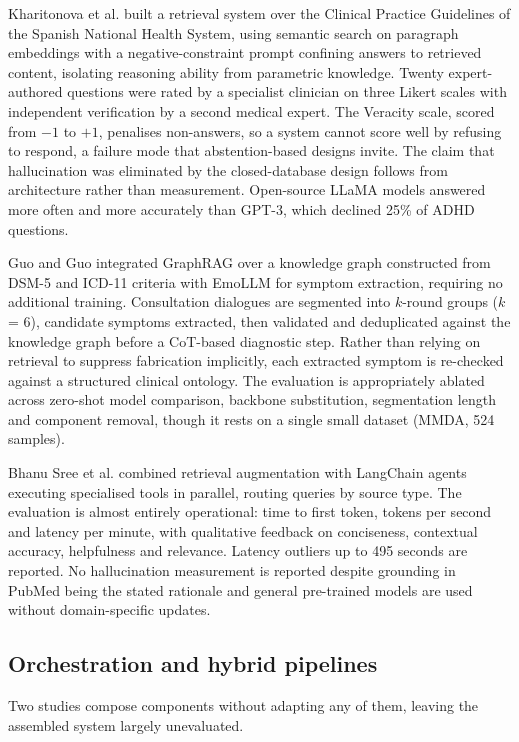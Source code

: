 \documentclass[11pt]{article}
\begin{document}
	Kharitonova et al.\cite{Kharitonova15062025} built a retrieval system over the Clinical Practice Guidelines of the Spanish National Health System, using semantic search on paragraph embeddings with a negative-constraint prompt confining answers to retrieved content, isolating reasoning ability from parametric knowledge. Twenty expert-authored questions were rated by a specialist clinician on three Likert scales with independent verification by a second medical expert. The Veracity scale, scored from $-1$ to $+1$, penalises non-answers, so a system cannot score well by refusing to respond, a failure mode that abstention-based designs invite. The claim that hallucination was eliminated by the closed-database design follows from architecture rather than measurement. Open-source LLaMA models answered more often and more accurately than GPT-3, which declined 25\% of ADHD questions.
	
	Guo and Guo\cite{10958051} integrated GraphRAG over a knowledge graph constructed from DSM-5 and ICD-11 criteria with EmoLLM for symptom extraction, requiring no additional training. Consultation dialogues are segmented into $k$-round groups ($k$ = 6), candidate symptoms extracted, then validated and deduplicated against the knowledge graph before a CoT-based diagnostic step. Rather than relying on retrieval to suppress fabrication implicitly, each extracted symptom is re-checked against a structured clinical ontology. The evaluation is appropriately ablated across zero-shot model comparison, backbone substitution, segmentation length and component removal, though it rests on a single small dataset (MMDA, 524 samples).
	
	Bhanu Sree et al.\cite{Sree2024RetrievalAugmentedGB} combined retrieval augmentation with LangChain agents executing specialised tools in parallel, routing queries by source type. The evaluation is almost entirely operational: time to first token, tokens per second and latency per minute, with qualitative feedback on conciseness, contextual accuracy, helpfulness and relevance. Latency outliers up to 495 seconds are reported. No hallucination measurement is reported despite grounding in PubMed being the stated rationale and general pre-trained models are used without domain-specific updates.
	
	\subsection{Orchestration and hybrid pipelines}
	
	Two studies compose components without adapting any of them, leaving the assembled system largely unevaluated.
	
\end{document}
